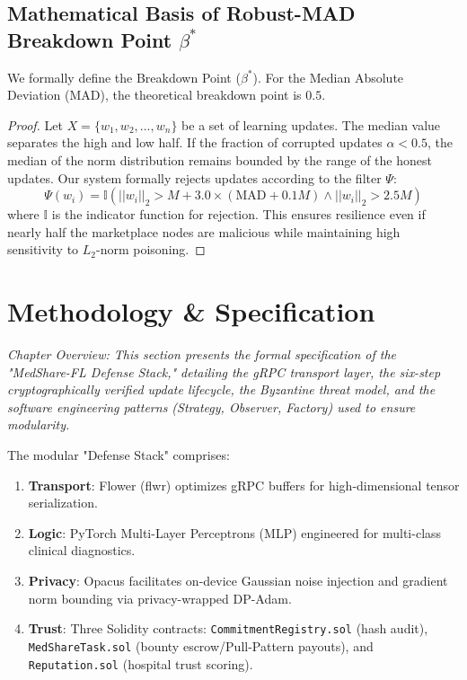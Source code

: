 \documentclass[10pt, a4paper, twocolumn]{article}
\begin{document}
\subsection{Mathematical Basis of Robust-MAD Breakdown Point \texorpdfstring{$\beta^*$}{beta*}}
We formally define the Breakdown Point ($\beta^*$). For the Median Absolute Deviation (MAD), the theoretical breakdown point is $0.5$.
\begin{proof}
Let $X = \{w_1, w_2, ..., w_n\}$ be a set of learning updates. The median value separates the high and low half. If the fraction of corrupted updates $\alpha < 0.5$, the median of the norm distribution remains bounded by the range of the honest updates. Our system formally rejects updates according to the filter $\Psi$:
\begin{equation}
    \Psi(w_i) = \mathbb{I}(||w_i||_2 > M + 3.0 \times (\text{MAD} + 0.1M) \land ||w_i||_2 > 2.5M)
\end{equation}
where $\mathbb{I}$ is the indicator function for rejection. This ensures resilience even if nearly half the marketplace nodes are malicious while maintaining high sensitivity to $L_2$-norm poisoning.
\end{proof}

\section{Methodology \& Specification}
\label{sec:methodology}

\textit{Chapter Overview: This section presents the formal specification of the "MedShare-FL Defense Stack," detailing the gRPC transport layer, the six-step cryptographically verified update lifecycle, the Byzantine threat model, and the software engineering patterns (Strategy, Observer, Factory) used to ensure modularity.}

The modular "Defense Stack" comprises:
\begin{enumerate}
    \item \textbf{Transport}: Flower (flwr) \cite{beutel2020} optimizes gRPC buffers for high-dimensional tensor serialization.
    \item \textbf{Logic}: PyTorch Multi-Layer Perceptrons (MLP) engineered for multi-class clinical diagnostics.
    \item \textbf{Privacy}: Opacus \cite{yousefpour2021} facilitates on-device Gaussian noise injection and gradient norm bounding via privacy-wrapped DP-Adam.
    \item \textbf{Trust}: Three Solidity contracts: \texttt{CommitmentRegistry.sol} (hash audit), \texttt{MedShareTask.sol} (bounty escrow/Pull-Pattern payouts), and \texttt{Reputation.sol} (hospital trust scoring).
\end{enumerate}
\end{document}
